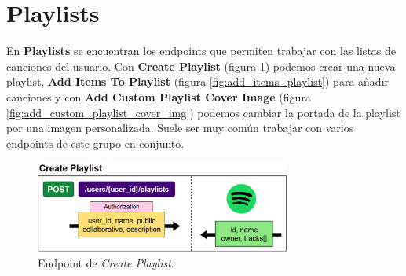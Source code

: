 \section*{Playlists}

En \textbf{Playlists} se encuentran los endpoints que permiten trabajar con las listas de canciones del usuario. Con \textbf{Create Playlist} (figura \ref{fig:create_playlist}) podemos crear una nueva playlist, \textbf{Add Items To Playlist} (figura \ref{fig:add_items_playlist}) para añadir canciones y con \textbf{Add Custom Playlist Cover Image} (figura \ref{fig:add_custom_playlist_cover_img}) podemos cambiar la portada de la playlist por una imagen personalizada. Suele ser muy común trabajar con varios endpoints de este grupo en conjunto.

\begin{figure}[H]
    \centering
    \includegraphics[width=0.75\textwidth]{figures/endpoints/create_playlist.png}
    \caption{Endpoint de \textit{Create Playlist}.}
    \label{fig:create_playlist}
\end{figure}

